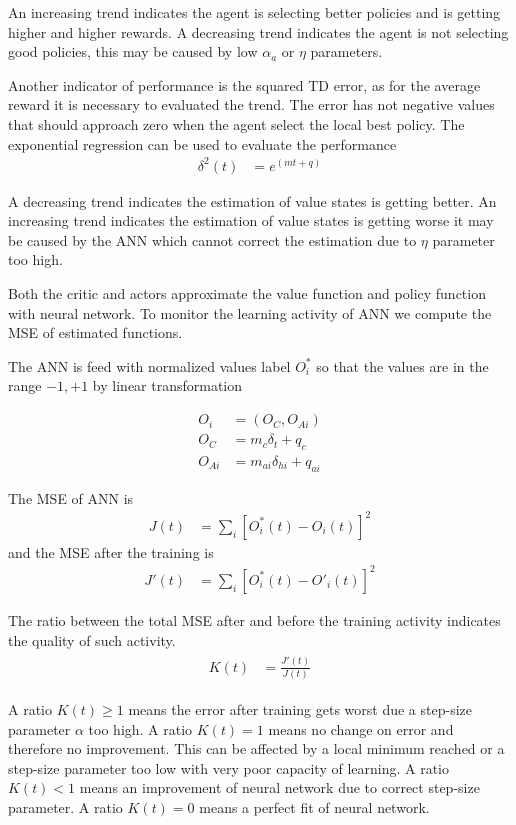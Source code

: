 \documentclass[]{article}
\begin{document}
An increasing trend indicates the agent is selecting better policies and is getting higher and higher rewards.
A decreasing trend indicates the agent is not selecting good policies, this may be caused by low $ \alpha_a $ or $ \eta $ parameters.

Another indicator of performance is the squared TD error, as for the average reward it is necessary to evaluated the trend.
The error has not negative values that should approach zero when the agent select the local best policy. The exponential regression can be used to evaluate the performance
\begin{align}
	\delta^2(t) & = e^{(mt + q)}
\end{align}

A decreasing trend indicates the estimation of value states is getting better.
An increasing trend indicates the estimation of value states is getting worse it may be caused by the ANN which cannot correct the estimation due to $ \eta $ parameter too high.

Both the critic and actors approximate the value function and policy function with neural network.
To monitor the learning activity of ANN we compute the MSE of estimated functions.


The ANN is feed with normalized values label $ O^*_i $ so that the values are in the range $ -1, +1 $ by linear transformation

\begin{align*}
	O_i &= (O_C, O_{Ai})
	\\
	O_C &= m_c \delta_t + q_c
	\\
	O_{Ai} &= m_{ai} \delta_{hi} + q_{ai}
\end{align*}

The MSE of ANN is
\begin{align*}
	J(t)&	= \sum_i [O^*_i(t) - O_i(t)]^2
\end{align*}
and the MSE after the training is
\begin{align*}
	J'(t)&	= \sum_i [O^*_i(t) - O'_i(t)]^2
\end{align*}

The ratio between the total MSE after and before the training activity indicates the quality of such activity.
\begin{align}
\begin{split}
	K(t)&	= \frac{J'(t)}{J(t)}
\end{split}
\end{align}

A ratio $ K(t) \ge 1 $ means the error after training gets worst due a step-size parameter $ \alpha $ too high.
A ratio $ K(t) = 1 $  means no change on error and therefore no improvement. This can be affected by a local minimum reached or a step-size parameter too low with very poor capacity of learning.
A ratio $ K(t) < 1 $ means an improvement of neural network due to correct step-size parameter.
A ratio $ K(t) = 0 $ means a perfect fit of neural network.
\end{document}

